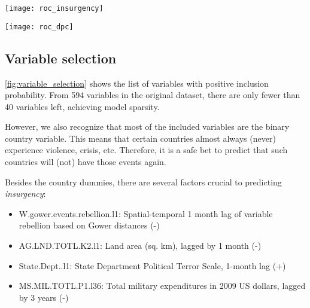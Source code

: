\documentclass[a0,portrait]{a0poster}
\begin{document}
\begin{multicols}{2}
%

\begin{center}
\texttt{[image: roc\_insurgency]}
\label{fig:roc_insurgency}
\end{center}

\begin{center}
\texttt{[image: roc\_dpc]}
\label{fig:roc_dpc}
\end{center}

\subsection*{Variable selection}

\autoref{fig:variable_selection} shows the list of variables with positive inclusion probability. From 594 variables in the original dataset, there are only fewer than 40 variables left, achieving model sparsity.

However, we also recognize that most of the included variables are the binary country variable. This means that certain countries almost always (never) experience violence, crisis, etc. Therefore, it is a safe bet to predict that such countries will (not) have those events again.

Besides the country dummies, there are several factors crucial to predicting \textit{insurgency}:
\begin{itemize}
\item W.gower.events.rebellion.l1: Spatial-temporal 1 month lag of variable rebellion based on Gower distances (-)
\item AG.LND.TOTL.K2.l1: Land area (sq. km), lagged by 1 month (-)
\item State.Dept..l1: State Department Political Terror Scale, 1-month lag (+)
\item MS.MIL.TOTL.P1.l36: Total military expenditures in 2009 US dollars, lagged by 3 years (-)
\end{itemize}


\end{multicols}
\end{document}
